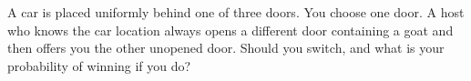 A car is placed uniformly behind one of three doors. You choose one door. A host who knows the car location always opens a different door containing a goat and then offers you the other unopened door. Should you switch, and what is your probability of winning if you do?
